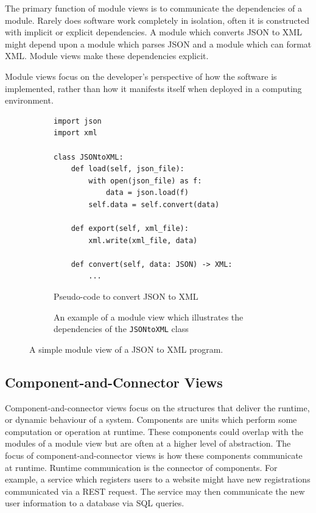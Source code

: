 The primary function of module views is to communicate the dependencies of a module.
Rarely does software work completely in isolation, often it is constructed with implicit or explicit dependencies.
A module which converts JSON to XML might depend upon a module which parses JSON and a module which can format XML.
Module views make these dependencies explicit.

Module views focus on the developer's perspective of how the software is implemented, rather than how it manifests itself when deployed in a computing environment.

\begin{figure}[ht]
\centering
\begin{subfigure}[b]{\textwidth}
\begin{shaded}
\begin{lstlisting}[style=python]
import json
import xml

class JSONtoXML:
    def load(self, json_file):
        with open(json_file) as f:
            data = json.load(f)
        self.data = self.convert(data)

    def export(self, xml_file):
        xml.write(xml_file, data)

    def convert(self, data: JSON) -> XML:
        ...
\end{lstlisting}
\end{shaded}
\caption{Pseudo-code to convert JSON to XML}
\end{subfigure}


\begin{subfigure}[b]{\textwidth}
\begin{center}
\end{center}
\caption{An example of a module view which illustrates the dependencies of the \texttt{JSONtoXML} class}
\end{subfigure}
\caption{A simple module view of a JSON to XML program.}
\end{figure}

\subsection{Component-and-Connector Views}
Component-and-connector views focus on the structures that deliver the runtime, or dynamic behaviour of a system.
Components are units which perform some computation or operation at runtime.
These components could overlap with the modules of a module view but are often at a higher level of abstraction.
The focus of component-and-connector views is how these components communicate at runtime.
Runtime communication is the connector of components.
For example, a service which registers users to a website might have new registrations communicated via a REST request.
The service may then communicate the new user information to a database via SQL queries.

